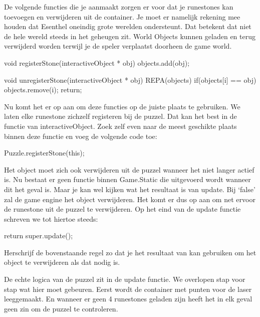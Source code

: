 De volgende functies die je aanmaakt zorgen er voor dat je runestones kan toevoegen en verwijderen uit de container. Je moet er namelijk rekening mee houden dat Esenthel oneindig grote werelden ondersteunt. Dat betekent dat niet de hele wereld steeds in het geheugen zit. World Objects kunnen geladen en terug verwijderd worden terwijl je de speler verplaatst doorheen de game world.

\begin{code}
void registerStone(interactiveObject * obj)
{
  objects.add(obj);
}

void unregisterStone(interactiveObject * obj)
{
  REPA(objects)
  {
     if(objects[i] == obj)
     {
        objects.remove(i);
        return;
     }
  }
}
\end{code}

Nu komt het er op aan om deze functies op de juiste plaats te gebruiken. We laten elke runestone zichzelf registeren bij de puzzel. Dat kan het best in de  functie van interactiveObject. Zoek zelf even naar de meest geschikte plaats binnen deze functie en voeg de volgende code toe:

\begin{code}
Puzzle.registerStone(this);
\end{code}

Het object moet zich ook verwijderen uit de puzzel wanneer het niet langer actief is. Nu bestaat er geen functie binnen Game.Static die uitgevoerd wordt wanneer dit het geval is. Maar je kan wel kijken wat het resultaat is van update. Bij `false' zal de game engine het object verwijderen. Het komt er dus op aan om net ervoor de runestone uit de puzzel te verwijderen. Op het eind van de update functie schreven we tot hiertoe steeds:

\begin{code}
return super.update();
\end{code}

\begin{exercise}
Herschrijf de bovenstaande regel zo dat je het resultaat van  kan gebruiken om het object te verwijderen als dat nodig is. 
\end{exercise}

De echte logica van de puzzel zit in de update functie. We overlopen stap voor stap wat hier moet gebeuren. Eerst wordt de container met punten voor de laser leeggemaakt. En wanneer er geen 4 runestones geladen zijn heeft het in elk geval geen zin om de puzzel te controleren.

